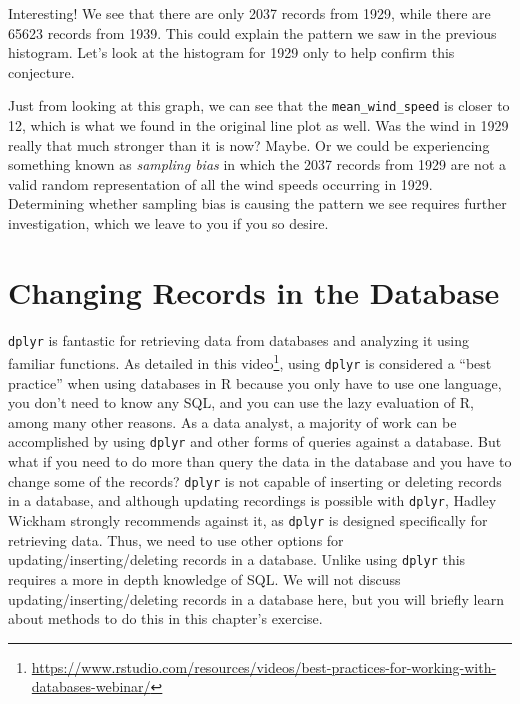 \documentclass[]{krantz}
\makeatletter
\newenvironment{Shaded}{\begin{snugshade}}{\end{snugshade}}
\newcommand{\KeywordTok}[1]{\textcolor[rgb]{0.27,0.27,0.27}{\textbf{#1}}}
\newcommand{\DecValTok}[1]{\textcolor[rgb]{0.06,0.06,0.06}{#1}}
\newcommand{\StringTok}[1]{\textcolor[rgb]{0.5,0.5,0.5}{#1}}
\newcommand{\OperatorTok}[1]{\textcolor[rgb]{0.43,0.43,0.43}{\textbf{#1}}}
\newcommand{\NormalTok}[1]{#1}
\renewcommand{\href}[2]{#2\footnote{\url{#1}}}
\newenvironment{kframe}{%
\medskip{}
\setlength{\fboxsep}{.8em}
 \def\at@end@of@kframe{}%
 \ifinner\ifhmode%
  \def\at@end@of@kframe{\end{minipage}}%
  \begin{minipage}{\columnwidth}%
 \fi\fi%
 \def\FrameCommand##1{\hskip\@totalleftmargin \hskip-\fboxsep
 \colorbox{shadecolor}{##1}\hskip-\fboxsep
     \hskip-\linewidth \hskip-\@totalleftmargin \hskip\columnwidth}%
 \MakeFramed {\advance\hsize-\width
   \@totalleftmargin\z@ \linewidth\hsize
   \@setminipage}}%
 {\par\unskip\endMakeFramed%
 \at@end@of@kframe}
\renewenvironment{Shaded}{\begin{kframe}}{\end{kframe}}
\makeatother
\begin{document}
Interesting! We see that there are only 2037 records from 1929, while
there are 65623 records from 1939. This could explain the pattern we saw
in the previous histogram. Let's look at the histogram for 1929 only to
help confirm this conjecture.

\begin{Shaded}
\end{Shaded}

Just from looking at this graph, we can see that the
\texttt{mean\_wind\_speed} is closer to 12, which is what we found in
the original line plot as well. Was the wind in 1929 really that much
stronger than it is now? Maybe. Or we could be experiencing something
known as \emph{sampling bias} in which the 2037 records from 1929 are
not a valid random representation of all the wind speeds occurring in
1929. Determining whether sampling bias is causing the pattern we see
requires further investigation, which we leave to you if you so desire.

\section{Changing Records in the
Database}\label{changing-records-in-the-database}

\texttt{dplyr} is fantastic for retrieving data from databases and
analyzing it using familiar functions. As detailed in this
\href{https://www.rstudio.com/resources/videos/best-practices-for-working-with-databases-webinar/}{video},
using \texttt{dplyr} is considered a ``best practice'' when using
databases in R because you only have to use one language, you don't need
to know any SQL, and you can use the lazy evaluation of R, among many
other reasons. As a data analyst, a majority of work can be accomplished
by using \texttt{dplyr} and other forms of queries against a database.
But what if you need to do more than query the data in the database and
you have to change some of the records? \texttt{dplyr} is not capable of
inserting or deleting records in a database, and although updating
recordings is possible with \texttt{dplyr}, Hadley Wickham strongly
recommends against it, as \texttt{dplyr} is designed specifically for
retrieving data. Thus, we need to use other options for
updating/inserting/deleting records in a database. Unlike using
\texttt{dplyr} this requires a more in depth knowledge of SQL. We will
not discuss updating/inserting/deleting records in a database here, but
you will briefly learn about methods to do this in this chapter's
exercise.
\end{document}
